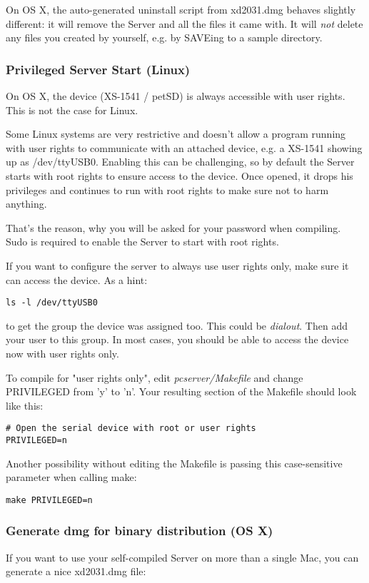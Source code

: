 On OS X, the auto-generated uninstall script from xd2031.dmg behaves
slightly different: it will remove the Server and all the files it came with. 
It will \textit{not} delete any files you created by yourself, e.g. by
SAVEing to a sample directory.

\subsubsection{Privileged Server Start (Linux)}
\label{rights}
On OS X, the device (XS-1541 / petSD) is always accessible with
user rights. This is not the case for Linux.

Some Linux systems are very restrictive and doesn't allow a program running
with user rights to communicate with an attached device, e.g. a XS-1541
showing up as /dev/ttyUSB0. Enabling this can be challenging, so by default
the Server starts with root rights to ensure access to the device.
Once opened, it drops his privileges and continues to run with root rights
to make sure not to harm anything.

That's the reason, why you will be asked for your password when compiling.
Sudo is required to enable the Server to start with root rights.

If you want to configure the server to always use user rights only, make sure
it can access the device. As a hint:

\begin{verbatim}
ls -l /dev/ttyUSB0
\end{verbatim}

to get the group the device was assigned too. This could be \textit{dialout}.
Then add your user to this group. In most cases, you should be able to
access the device now with user rights only.

To compile for "user rights only", edit 
\textit{pcserver/Makefile} and change PRIVILEGED from 'y' to 'n'.
Your resulting section of the Makefile should look like this:

\begin{verbatim}
# Open the serial device with root or user rights
PRIVILEGED=n
\end{verbatim}

Another possibility without editing the Makefile is passing this
case-sensitive parameter when calling make:

\begin{verbatim}
make PRIVILEGED=n
\end{verbatim}

\subsubsection{Generate dmg for binary distribution (OS X)}
If you want to use your self-compiled Server on more than a single Mac,
you can generate a nice xd2031.dmg file:

